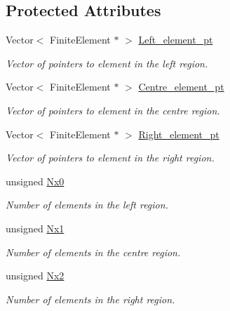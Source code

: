 \subsection*{Protected Attributes}
\begin{DoxyCompactItemize}
\item 
Vector$<$ Finite\+Element $\ast$ $>$ \hyperlink{classoomph_1_1ChannelSpineMesh_aaa8df0751eebdab02466afa0253dedbd}{Left\+\_\+element\+\_\+pt}
\begin{DoxyCompactList}\small\item\em Vector of pointers to element in the left region. \end{DoxyCompactList}\item 
Vector$<$ Finite\+Element $\ast$ $>$ \hyperlink{classoomph_1_1ChannelSpineMesh_aef52a18c46a4ec6121a129789d46db3e}{Centre\+\_\+element\+\_\+pt}
\begin{DoxyCompactList}\small\item\em Vector of pointers to element in the centre region. \end{DoxyCompactList}\item 
Vector$<$ Finite\+Element $\ast$ $>$ \hyperlink{classoomph_1_1ChannelSpineMesh_a1cc77e7badcd1756b03aa307534011ec}{Right\+\_\+element\+\_\+pt}
\begin{DoxyCompactList}\small\item\em Vector of pointers to element in the right region. \end{DoxyCompactList}\item 
unsigned \hyperlink{classoomph_1_1ChannelSpineMesh_a283ffaeb501cec43df629d3bf06fe3d2}{Nx0}
\begin{DoxyCompactList}\small\item\em Number of elements in the left region. \end{DoxyCompactList}\item 
unsigned \hyperlink{classoomph_1_1ChannelSpineMesh_a678cfaebcb1c7a31027188af36be9e7b}{Nx1}
\begin{DoxyCompactList}\small\item\em Number of elements in the centre region. \end{DoxyCompactList}\item 
unsigned \hyperlink{classoomph_1_1ChannelSpineMesh_a46534250de6f75890463bfddefdb39cd}{Nx2}
\begin{DoxyCompactList}\small\item\em Number of elements in the right region. \end{DoxyCompactList}\item 

\end{DoxyCompactItemize}
